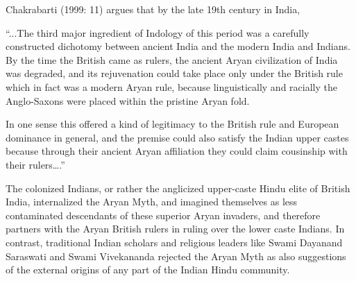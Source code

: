 Chakrabarti (1999: 11) argues that by the late 19th century in India,

\begin{myquote}
“...The third major ingredient of Indology of this period was a carefully constructed dichotomy between ancient India and the modern India and Indians. By the time the British came as rulers, the ancient Aryan civilization of India was degraded, and its rejuvenation could take place only under the British rule which in fact was a modern Aryan rule, because linguistically and racially the Anglo-Saxons were placed within the pristine Aryan fold.
\end{myquote}

\begin{myquote}
In one sense this offered a kind of legitimacy to the British rule and European dominance in general, and the premise could also satisfy the Indian upper castes because through their ancient Aryan affiliation they could claim cousinship with their rulers….”
\end{myquote}

The colonized Indians, or rather the anglicized upper-caste Hindu elite of British India, internalized the Aryan Myth, and imagined themselves as less contaminated descendants of these superior Aryan invaders, and therefore partners with the Aryan British rulers in ruling over the lower caste Indians. In contrast, traditional Indian scholars and religious leaders like Swami Dayanand Saraswati and Swami Vivekananda rejected the Aryan Myth as also suggestions of the external origins of any part of the Indian Hindu community.

